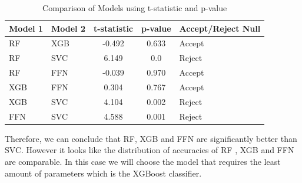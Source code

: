 \documentclass[11pt]{extarticle}
\begin{document}
    \begin{table}[h!]
        \centering
        \caption{Comparison of Models using t-statistic and p-value}
        \begin{tabular}{|l|l|c|c|l|}
            \hline
            \textbf{Model 1} & \textbf{Model 2} & \textbf{t-statistic} & \textbf{p-value} & \textbf{Accept/Reject Null} \\
            \hline
            RF & XGB & -0.492 & 0.633 & Accept \\
            \hline
            RF & SVC & 6.149 & 0.0 & Reject \\
            \hline
            RF & FFN & -0.039 & 0.970 & Accept \\
            \hline
            XGB & FFN & 0.304 & 0.767 & Accept \\
            \hline
            XGB & SVC & 4.104 & 0.002 & Reject \\
            \hline
            FFN & SVC & 4.588 & 0.001 & Reject \\
            \hline
        \end{tabular}
    \end{table}
Therefore, we can conclude that RF, XGB and FFN are significantly better than SVC. However it looks like the distribution of accuracies of RF , XGB and FFN are comparable. In this case we will choose the model that requires the least amount of parameters which is the XGBoost classifier.
\end{document}
